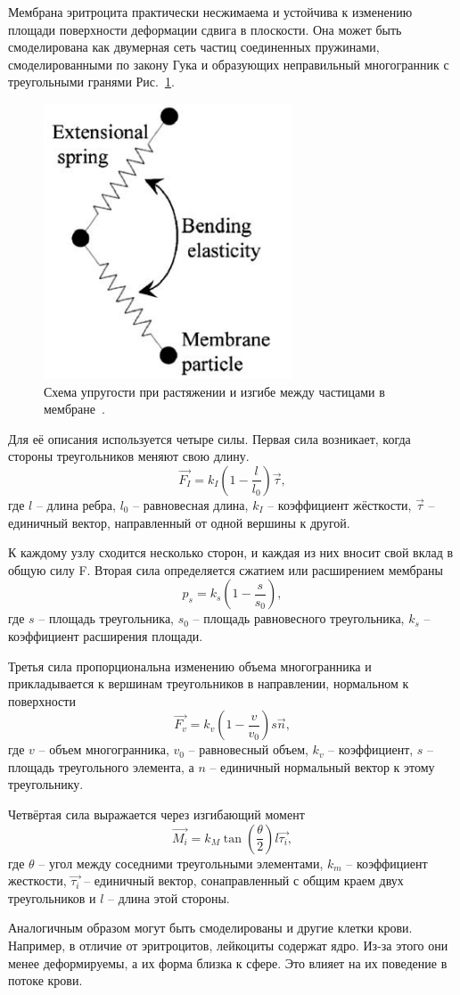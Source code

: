 Мембрана эритроцита практически несжимаема и устойчива к изменению площади поверхности деформации сдвига в плоскости. 
Она может быть смоделирована как двумерная сеть частиц соединенных пружинами, смоделированными по закону Гука 
и образующих неправильный многогранник с треугольными гранями Рис.~\ref{elasticity scheme}.

\begin{figure}[h]
\centering
\includegraphics[width=0.2\linewidth]{mol3.png}
\caption{ Схема упругости при растяжении и изгибе между частицами в мембране~\cite{hosseini:2009}.}
\label{elasticity scheme}
\end{figure}

Для её описания используется четыре силы.
Первая сила возникает, когда стороны треугольников меняют свою длину.
$$
\vec {F_I}=k_I\left(1- \frac{l}{l_0}\right)\vec\tau,
$$
где $l$ -- длина ребра, $l_0$ -- равновесная длина, $k_I$ -- коэффициент жёсткости, $\vec {\tau}$ -- единичный вектор, 
направленный от одной вершины к другой.

К каждому узлу сходится несколько сторон, и каждая из них вносит свой вклад в общую силу F. 
Вторая сила определяется сжатием или расширением мембраны 
$$
{p_s}=k_s\left(1- \frac{s}{s_0}\right),
$$
где $s$ -- площадь треугольника, $s_0$ -- площадь равновесного треугольника, $k_s$ -- коэффициент расширения площади.

Третья сила пропорциональна изменению объема многогранника и прикладывается к вершинам треугольников в направлении, нормальном к поверхности 
$$
\vec{F_v}=k_v\left(1- \frac{v}{v_0}\right) s \vec{n},
$$
где $v$ -- объем многогранника, $v_0$ -- равновесный объем, $k_v$ -- коэффициент, $s$ -- площадь
треугольного элемента, а $n$ -- единичный нормальный вектор к этому треугольнику.

Четвёртая сила выражается через изгибающий момент~\cite{hosseini:2009} 
$$
 \vec{M_i}=k_M \tan\left(\frac{\theta}{2}\right)l \vec{\tau_i},
$$
где $\theta$ -- угол между соседними треугольными элементами, 
$k_m$ -- коэффициент жесткости, $\vec{\tau_i}$ -- единичный вектор, сонаправленный с общим краем двух треугольников 
и $l$ -- длина этой стороны.

Аналогичным образом могут быть смоделированы и другие клетки крови. Например, в отличие от эритроцитов, лейкоциты содержат ядро. 
Из-за этого они менее деформируемы, а их форма близка к сфере. Это влияет на их поведение в потоке крови.

